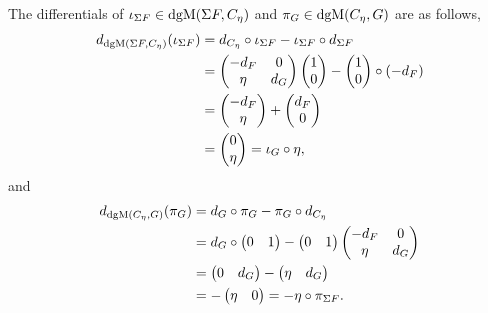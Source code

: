 \begin{remark}
    The differentials of \( \iota_{\Sigma F} \in \operatorname{dgM}(\Sigma F, C_{\eta}) \) and \( \pi_G \in \operatorname{dgM}(C_{\eta}, G) \) are as follows,
    \begin{align*}
        d_{\operatorname{dgM}(\Sigma F, C_{\eta})}(\iota_{\Sigma F}) &= d_{C_{\eta}} \circ \iota_{\Sigma F} - \iota_{\Sigma F} \circ d_{\Sigma F} \\
        &=
        \begin{pmatrix}
            -d_F & 0 \\
            \eta & d_G
        \end{pmatrix}
        \begin{pmatrix}
            1 \\
            0
        \end{pmatrix}
        -
        \begin{pmatrix}
            1 \\
            0
        \end{pmatrix}
        \circ (- d_F) \\
        &=
        \begin{pmatrix}
            -d_F \\
            \eta
        \end{pmatrix}
        +
        \begin{pmatrix}
            d_F \\
            0
        \end{pmatrix} \\
        &=
        \begin{pmatrix}
            0 \\
            \eta
        \end{pmatrix}
        = \iota_G \circ \eta,
    \end{align*}
    and
    \begin{align*}
        d_{\operatorname{dgM}(C_{\eta}, G)}(\pi_G) &= d_G \circ \pi_G - \pi_G \circ d_{C_{\eta}} \\
        &= d_G \circ
        \begin{pmatrix}
            0 & 1
        \end{pmatrix}
        -
        \begin{pmatrix}
            0 & 1
        \end{pmatrix}
        \begin{pmatrix}
            -d_F & 0 \\
            \eta & d_G
        \end{pmatrix} \\
        &=
        \begin{pmatrix}
            0 & d_G
        \end{pmatrix}
        -
        \begin{pmatrix}
            \eta & d_G
        \end{pmatrix} \\
        &= -
        \begin{pmatrix}
            \eta & 0
        \end{pmatrix}
        = - \eta \circ \pi_{\Sigma F}.
    \end{align*}
\end{remark}


